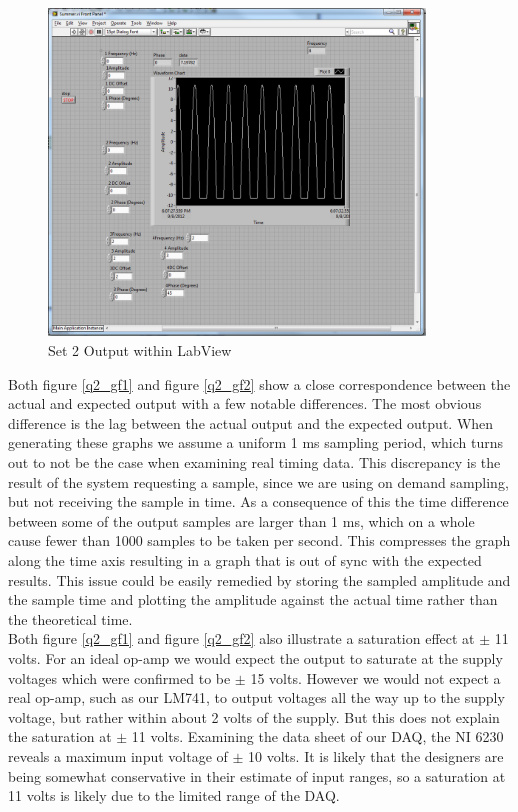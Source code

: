 \documentclass{article}
\theoremstyle{plain}
\theoremstyle{definition}
\theoremstyle{remark}
\begin{document}
\begin{figure}[hbt]
\begin{center}
\includegraphics[width = 10cm]{set2partgproblem2.png}
\caption{Set 2 Output within LabView}
\label{q2_gf3}
\end{center}
\end{figure}

Both figure \ref{q2_gf1} and figure \ref{q2_gf2} show a close correspondence between the actual and expected output with a few notable differences.  The most  obvious difference is the lag between the actual output and the expected output.  When generating these graphs we assume a uniform 1 ms sampling period, which turns out to not be the case when examining real timing data.  This discrepancy is the result of the system requesting a sample, since we are using on demand sampling, but not receiving the sample in time.  As a consequence of this the time difference between some of the output samples are larger than 1 ms, which on a whole cause fewer than 1000 samples to be taken per second.  This compresses the graph along the time axis resulting in a graph that is out of sync with the expected results.  This issue could be easily remedied by storing the sampled amplitude and the sample time and plotting the amplitude against the actual time rather than the theoretical time.  \\

Both figure \ref{q2_gf1} and figure \ref{q2_gf2} also illustrate a saturation effect at $\pm$ 11 volts.  For an ideal op-amp we would expect the output to saturate at the supply voltages which were confirmed to be  $\pm$ 15 volts. However we would not expect a real op-amp, such as our LM741, to output voltages all the way up to the supply voltage, but rather within about 2 volts of the supply.  But this does not explain the saturation at $\pm$ 11 volts.  Examining the data sheet of our DAQ, the NI 6230 reveals a maximum input voltage of $\pm$ 10 volts.  It is likely that the designers are being somewhat conservative in their estimate of input ranges, so a saturation at 11 volts is likely due to the limited range of the DAQ.
\end{document}
